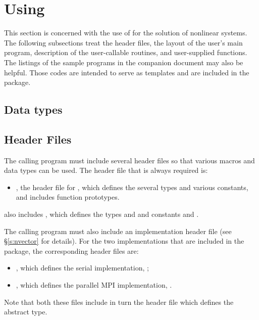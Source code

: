 \chapter{Using {\kinsol}}\label{c:usage}

This section is concerned with the use of {\kinsol} for the solution of nonlinear systems.
The following subsections treat the header files, the layout of the user's main
program, description of the {\kinsol} user-callable routines, and user-supplied functions.
The listings of the sample programs in the companion document \cite{kinsol2.2.0_ex} may also 
be helpful. Those codes are intended to serve as templates and are included in the 
{\kinsol} package.

\section{Data types}\label{s:types}


\section{Header Files}\label{s:header_sol}

The calling program must include several header files so that various macros
and data types can be used. The header file that is always required is:
%
\begin{itemize}
\item  {}, 
  the header file for {\kinsol}, which defines the several
  types and various constants, and includes function prototypes.
\end{itemize}
%
 also includes , 
which defines the types  and 
and constants  and .

The calling program must also include an {\nvector} implementation header file
(see \S\ref{s:nvector} for details).
For the two {\nvector} implementations that are included in the {\kinsol} package,
the corresponding header files are:
%
\begin{itemize}
\item {}, 
  which defines the serial implementation, {\nvecs};
\item {}, 
  which defines the parallel MPI implementation, {\nvecp}.
\end{itemize}
%
Note that both these files include in turn the header file  which 
defines the abstract  type. 

